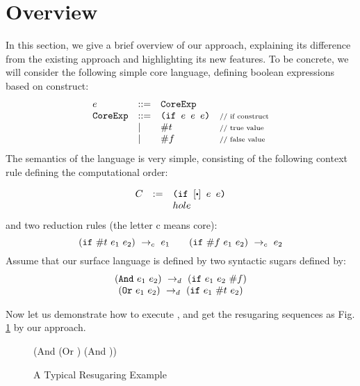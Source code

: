 \section{Overview}
\label{sec2}


In this section, we give a brief overview of our approach, explaining its difference from the existing  approach and highlighting its new features. To be concrete, we will consider the following simple core language, defining boolean expressions based on  construct:
\[
\begin{array}{lllll}
e &::=& \mbox{\tt CoreExp}\\
\mbox{\tt CoreExp} &::=& \texttt{(if~$e$~$e$~$e$)} &\mbox{{\scriptsize // if construct}}\\
& |& \#t  & \mbox{{\scriptsize // true value}}\\
& |& \#f & \mbox{{\scriptsize // false value}}
\end{array}
\]
The semantics of the language is very simple, consisting of the following context rule defining the computational order:

\[
\begin{array}{lcl}
C &:=& \Code{(if $[\bigcdot]$ $e$ $e$)}\\
&&hole\\
\end{array}
\]
and two reduction rules (the letter c means core):
\[
\centering
 \redc{(\m{if}~\true~e_1~e_2)}{e_1}  \qquad \redc{(\m{if}~\false~e_1~e_2)}{e_2} 
\]
Assume that our surface language is defined by two syntactic sugars defined by:
\[
\begin{array}{c}
(\mbox{\tt And}~e_1~e_2) ~\rightarrow_d~ (\mbox{\tt if}~e_1~e_2~\#f)\\
(\mbox{\tt Or}~e_1~e_2) ~\rightarrow_d~ (\mbox{\tt if}~e_1~\#t~e_2)
\end{array}
\]


Now let us demonstrate how to execute , and get the resugaring sequences as Fig.  \ref{fig:standard} by our approach.

\begin{figure}[thb]
\begin{center}
\begin{minipage}{6cm}
\begin{footnotesize}
\begin{Codes}
    (And (Or \true \false) (And \false \true))
\end{Codes}
\end{footnotesize}
\end{minipage}
\end{center}
\caption{A Typical Resugaring Example}
\label{fig:standard}
\end{figure}



